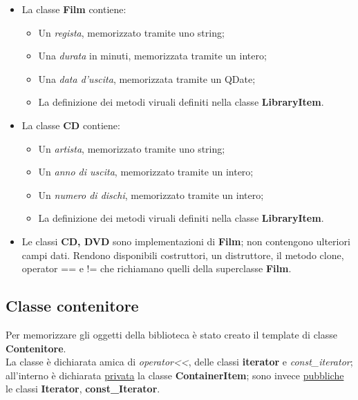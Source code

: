 {{\begin{itemize}
				\begin{itemize}\itemsep=0.5pt
					\item Un \textit{autore}, memorizzato tramite uno string;
					\item Un \textit{anno di uscita}, memorizzato tramite un intero;
					\item Un \textit{editore}, memorizzato tramite uno string;
					\item La definizione dei metodi viruali definiti nella classe  \textbf{LibraryItem}.
				\end{itemize}
				\item La classe \textbf{Film} contiene:
				\begin{itemize}\itemsep=0.5pt
					\item Un \textit{regista}, memorizzato tramite uno string;
					\item Una \textit{durata} in minuti, memorizzata tramite un intero;
					\item Una \textit{data d'uscita}, memorizzata tramite un QDate;
					\item La definizione dei metodi viruali definiti nella classe  \textbf{LibraryItem}.
				\end{itemize}
				\item La classe \textbf{CD}  contiene:
				\begin{itemize}\itemsep=0.5pt
					\item Un \textit{artista}, memorizzato tramite uno string;
					\item Un \textit{anno di uscita}, memorizzato tramite un intero;
					\item Un \textit{numero di dischi}, memorizzato tramite un intero;
					\item La definizione dei metodi viruali definiti nella classe  \textbf{LibraryItem}.
				\end{itemize}
				\item Le classi \textbf{CD, DVD} sono implementazioni di \textbf{Film}; non contengono ulteriori campi dati. Rendono disponibili costruttori, un distruttore, il metodo clone, operator == e != che richiamano quelli della superclasse \textbf{Film}.
			\end{itemize}
		}
		\subsection{Classe contenitore}{
			Per memorizzare gli oggetti della biblioteca è stato creato il template di classe \textbf{Contenitore}. \\
			La classe è dichiarata amica di \textit{operator<<}, delle classi \textbf{iterator} e  \textit{const\_iterator}; all'interno è dichiarata \underline{privata} la classe \textbf{ContainerItem}; sono invece \underline{pubbliche} le classi \textbf{Iterator}, \textbf{const\_Iterator}.\\
}}
